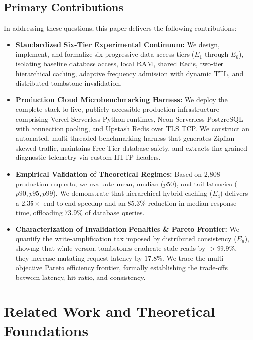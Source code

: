 \documentclass[conference]{IEEEtran}
\begin{document}
\subsection{Primary Contributions}
In addressing these questions, this paper delivers the following contributions:
\begin{itemize}
    \item \textbf{Standardized Six-Tier Experimental Continuum:} We design, implement, and formalize six progressive data-access tiers ($E_1$ through $E_6$), isolating baseline database access, local RAM, shared Redis, two-tier hierarchical caching, adaptive frequency admission with dynamic TTL, and distributed tombstone invalidation.
    \item \textbf{Production Cloud Microbenchmarking Harness:} We deploy the complete stack to live, publicly accessible production infrastructure comprising Vercel Serverless Python runtimes, Neon Serverless PostgreSQL with connection pooling, and Upstash Redis over TLS TCP. We construct an automated, multi-threaded benchmarking harness that generates Zipfian-skewed traffic, maintains Free-Tier database safety, and extracts fine-grained diagnostic telemetry via custom HTTP headers.
    \item \textbf{Empirical Validation of Theoretical Regimes:} Based on 2,808 production requests, we evaluate mean, median ($p50$), and tail latencies ($p90, p95, p99$). We demonstrate that hierarchical hybrid caching ($E_4$) delivers a $2.36\times$ end-to-end speedup and an $85.3\%$ reduction in median response time, offloading $73.9\%$ of database queries.
    \item \textbf{Characterization of Invalidation Penalties \& Pareto Frontier:} We quantify the write-amplification tax imposed by distributed consistency ($E_6$), showing that while version tombstones eradicate stale reads by $>99.9\%$, they increase mutating request latency by $17.8\%$. We trace the multi-objective Pareto efficiency frontier, formally establishing the trade-offs between latency, hit ratio, and consistency.
\end{itemize}

\section{Related Work and Theoretical Foundations}
\end{document}

